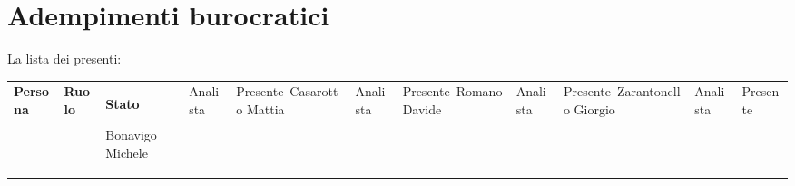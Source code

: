 \section{Adempimenti burocratici}

La lista dei presenti:

\begin{center}
    \begin{tabularx}{\linewidth}{X l l}
        \textbf{Persona} & \textbf{Ruolo} & \textbf{Stato}\

        \hline

        Bonavigo Michele & Analista & Presente\
        Casarotto Mattia & Analista & Presente\
        Romano Davide & Analista & Presente\
        Zarantonello Giorgio & Analista & Presente\

    \end{tabularx}
\end{center}